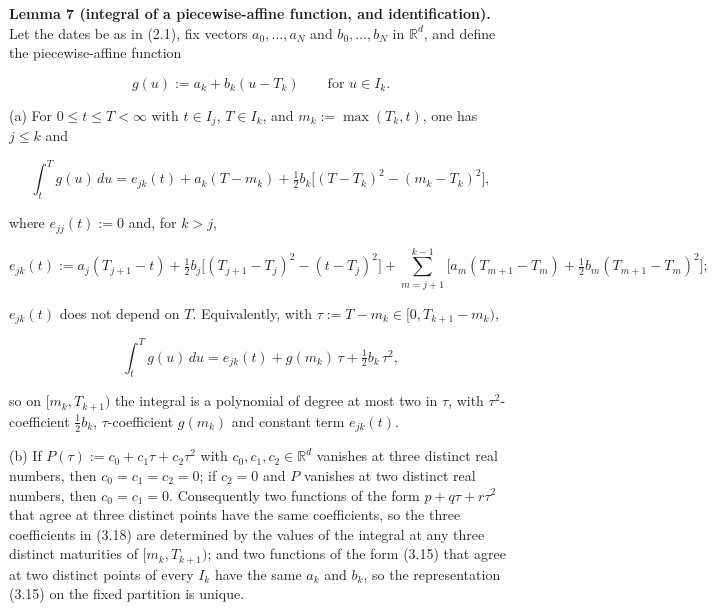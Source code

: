 \documentclass[11pt]{article}
\begin{document}
\label{res:Lemma-7}
\textbf{Lemma 7 (integral of a piecewise-affine function, and identification).} Let the dates be as in (2.1), fix vectors \(a_0, \dots, a_N\) and \(b_0, \dots, b_N\) in \(\mathbb R^d\), and define the piecewise-affine function

\begin{equation*}
g(u) := a_k + b_k (u - T_k) \qquad \text{for } u \in I_k. \tag{3.15}\label{eq:3.15}
\end{equation*}

(a) For \(0 \le t \le T < \infty\) with \(t \in I_j\), \(T \in I_k\), and \(m_k := \max(T_k, t)\), one has \(j \le k\) and

\begin{equation*}
\int_t^T g(u)\,du = e_{jk}(t) + a_k (T - m_k) + \tfrac12 b_k \bigl[ (T - T_k)^2 - (m_k - T_k)^2 \bigr], \tag{3.16}\label{eq:3.16}
\end{equation*}

where \(e_{jj}(t) := 0\) and, for \(k > j\),

\begin{equation*}
e_{jk}(t) := a_j (T_{j+1} - t) + \tfrac12 b_j \bigl[ (T_{j+1} - T_j)^2 - (t - T_j)^2 \bigr] + \sum_{m=j+1}^{k-1} \bigl[ a_m (T_{m+1} - T_m) + \tfrac12 b_m (T_{m+1} - T_m)^2 \bigr]; \tag{3.17}\label{eq:3.17}
\end{equation*}

\(e_{jk}(t)\) does not depend on \(T\). Equivalently, with \(\tau := T - m_k \in [0, T_{k+1} - m_k)\),

\begin{equation*}
\int_t^T g(u)\,du = e_{jk}(t) + g(m_k)\, \tau + \tfrac12 b_k\, \tau^2, \tag{3.18}\label{eq:3.18}
\end{equation*}

so on \([m_k, T_{k+1})\) the integral is a polynomial of degree at most two in \(\tau\), with \(\tau^2\)-coefficient \(\tfrac12 b_k\), \(\tau\)-coefficient \(g(m_k)\) and constant term \(e_{jk}(t)\).

(b) If \(P(\tau) := c_0 + c_1 \tau + c_2 \tau^2\) with \(c_0, c_1, c_2 \in \mathbb R^d\) vanishes at three distinct real numbers, then \(c_0 = c_1 = c_2 = 0\); if \(c_2 = 0\) and \(P\) vanishes at two distinct real numbers, then \(c_0 = c_1 = 0\). Consequently two functions of the form \(p + q\tau + r\tau^2\) that agree at three distinct points have the same coefficients, so the three coefficients in (3.18) are determined by the values of the integral at any three distinct maturities of \([m_k, T_{k+1})\); and two functions of the form (3.15) that agree at two distinct points of every \(I_k\) have the same \(a_k\) and \(b_k\), so the representation (3.15) on the fixed partition is unique.
\end{document}
